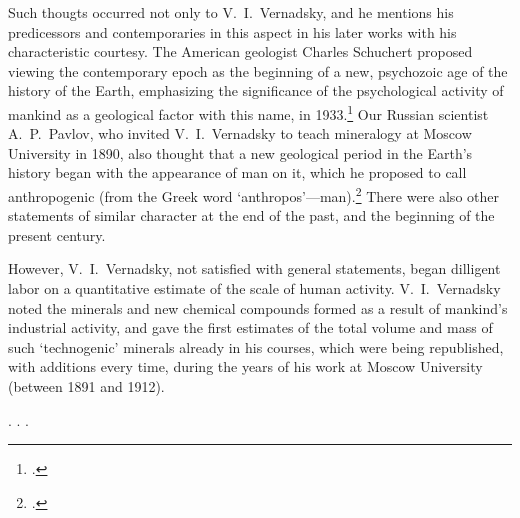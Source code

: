 Such thougts occurred not only to V.~I.\ Vernadsky, and he mentions his
predicessors and contemporaries in this aspect in his later works with his
characteristic courtesy.  The American geologist
Charles Schuchert proposed viewing the contemporary epoch as the beginning of a
new, psychozoic age of the history of the Earth, emphasizing the significance
of the psychological activity of mankind as a geological factor with this name,
in 1933.\footcite[80]{schuchert1933geology}  Our Russian scientist A.~P.\
Pavlov, who invited V.~I.\ Vernadsky to teach mineralogy at Moscow
University in 1890, also thought that a new geological period in the Earth's
history began with the appearance of man on it, which he proposed to call
anthropogenic (from the Greek word
`anthropos'---man).\footcite{pavlov1922lednikovye}  There were also other
statements of similar character at the end of the past, and the beginning of
the present century.

However, V.~I.\ Vernadsky, not satisfied with general statements, began
dilligent labor on a quantitative estimate of the scale of human activity.
V.~I.\ Vernadsky noted the minerals and new chemical compounds formed as a
result of mankind's industrial activity, and gave the first estimates of the
total volume and mass of such `technogenic' minerals already in his
\rtitle{Mineralogy} courses, which were being republished, with additions every time, during the years of
his work at Moscow University (between 1891 and 1912).

. . .
